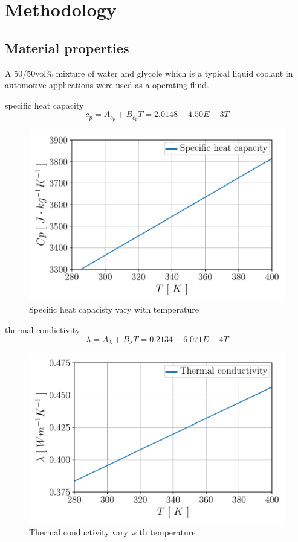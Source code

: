 \documentclass[12pt,oneside]{jbook}
\begin{document}
\chapter{Methodology}
\section{Material properties}
A 50/50vol\% mixture of water and glycole which is a typical liquid coolant in automotive applications were used as a operating fluid.

specific heat capacity
\begin{equation}
	c_{p} = A_{c_{p}}+B_{c_{p}} T = 2.0148 + 4.50E-3T
	\label{Cp}
\end{equation}
\begin{figure}[ht]
	\vspace{0zh}
	\begin{center}
		\includegraphics[width=0.65\linewidth]{fig/mp_cp.pdf}
		\vspace{-1zh}
		\caption{Specific heat capacisty vary with temperature}
		\label{cp}
	\end{center}
	\vspace{0zh}
\end{figure}


thermal condictivity
\begin{equation}
	\lambda = A_{\lambda}+B_{\lambda} T = 0.2134 + 6.071E-4T
	\label{lambda}
\end{equation}
\begin{figure}[ht]
	\vspace{0zh}
	\begin{center}
		\includegraphics[width=0.65\linewidth]{fig/mp_lambda.pdf}
		\vspace{-1zh}
		\caption{Thermal conductivity vary with temperature}
		\label{lambda}
	\end{center}
	\vspace{0zh}
\end{figure}
\end{document}
